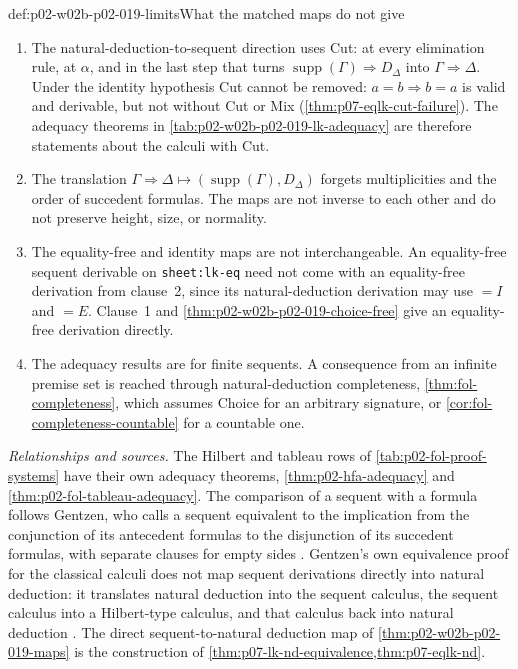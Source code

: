 \begin{hbwarning}{def:p02-w02b-p02-019-limits}{What the matched maps do not give}
\begin{enumerate}
 \item The natural-deduction-to-sequent direction uses Cut: at every
   elimination rule, at \(\alpha\), and in the last step that turns
   \(\operatorname{supp}(\Gamma)\Rightarrow D_{\Delta}\) into
   \(\Gamma\Rightarrow\Delta\).  Under the identity hypothesis Cut cannot be
   removed: \(a=b\Rightarrow b=a\) is valid and derivable, but not without Cut
   or Mix (\cref{thm:p07-eqlk-cut-failure}).  The adequacy theorems in
   \cref{tab:p02-w02b-p02-019-lk-adequacy} are therefore statements about the
   calculi with Cut.
 \item The translation \(\Gamma\Rightarrow\Delta\mapsto
   (\operatorname{supp}(\Gamma),D_{\Delta})\) forgets multiplicities and the
   order of succedent formulas.  The maps are not inverse to each other and
   do not preserve height, size, or normality.
 \item The equality-free and identity maps are not interchangeable.  An
   equality-free sequent derivable on \texttt{sheet:lk-eq} need not come with
   an equality-free derivation from clause~2, since its natural-deduction
   derivation may use \(=I\) and \(=E\).  Clause~1 and
   \cref{thm:p02-w02b-p02-019-choice-free} give an equality-free derivation
   directly.
 \item The adequacy results are for finite sequents.  A consequence from an
   infinite premise set is reached through natural-deduction completeness,
   \cref{thm:fol-completeness}, which assumes Choice for an arbitrary
   signature, or \cref{cor:fol-completeness-countable} for a countable one.
\end{enumerate}
\end{hbwarning}

\emph{Relationships and sources.}  The Hilbert and tableau rows of \cref{tab:p02-fol-proof-systems} have their
own adequacy theorems, \cref{thm:p02-hfa-adequacy} and
\cref{thm:p02-fol-tableau-adequacy}.  The comparison of a sequent with a
formula follows Gentzen, who calls a sequent equivalent to the implication
from the conjunction of its antecedent formulas to the disjunction of its
succedent formulas, with separate clauses for empty sides
\cite[Abschnitt~V, \S~1, pp.~417--418]{Gentzen1935b}.  Gentzen's own
equivalence proof for the classical calculi does not map sequent derivations
directly into natural deduction: it translates natural deduction into the
sequent calculus, the sequent calculus into a Hilbert-type calculus, and that
calculus back into natural deduction
\cite[Abschnitt~V, \S~6, p.~429]{Gentzen1935b}.  The direct sequent-to-natural
deduction map of \cref{thm:p02-w02b-p02-019-maps} is the construction of
\cref{thm:p07-lk-nd-equivalence,thm:p07-eqlk-nd}.
